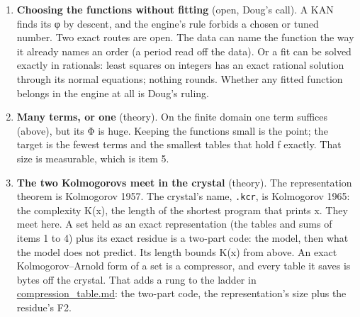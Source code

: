 \begin{enumerate}
\item \textbf{Choosing the functions without fitting} (open, Doug's call). A KAN finds its φ by descent, and the engine's rule forbids a chosen or tuned number. Two exact routes are open. The data can name the function the way it already names an order (a period read off the data). Or a fit can be solved exactly in rationals: least squares on integers has an exact rational solution through its normal equations; nothing rounds. Whether any fitted function belongs in the engine at all is Doug's ruling.
\item \textbf{Many terms, or one} (theory). On the finite domain one term suffices (above), but its Φ is huge. Keeping the functions small is the point; the target is the fewest terms and the smallest tables that hold f exactly. That size is measurable, which is item 5.
\item \textbf{The two Kolmogorovs meet in the crystal} (theory). The representation theorem is Kolmogorov 1957. The crystal's name, \texttt{.\allowbreak{}kcr}, is Kolmogorov 1965: the complexity K(x), the length of the shortest program that prints x. They meet here. A set held as an exact representation (the tables and sums of items 1 to 4) plus its exact residue is a two-part code: the model, then what the model does not predict. Its length bounds K(x) from above. An exact Kolmogorov–Arnold form of a set is a compressor, and every table it saves is bytes off the crystal. That adds a rung to the ladder in \hyperref[chap:compression-table]{compression\_\allowbreak{}table.md}: the two-part code, the representation's size plus the residue's F2.
\end{enumerate}

